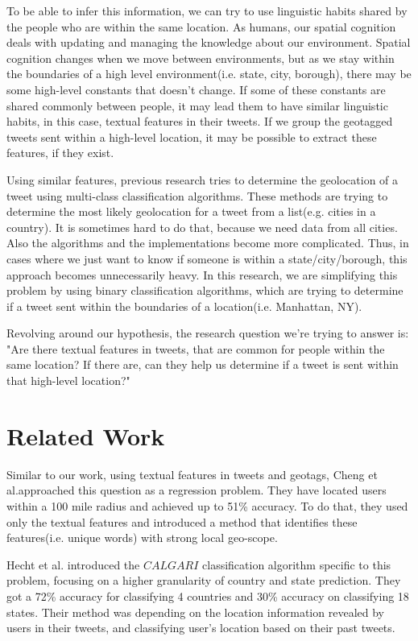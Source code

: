 \documentclass[twoside,11pt]{article}
\begin{document}
To be able to infer this information, we can try to use linguistic habits shared by the people who are within the same location. As humans, our spatial cognition deals with updating and managing the knowledge about our environment. Spatial cognition changes when we move between environments, but as we stay within the boundaries of a high level environment(i.e. state, city, borough), there may be some high-level constants that doesn't change. If some of these constants are shared commonly between people, it may lead them to have similar linguistic habits, in this case, textual features in their tweets. If we group the geotagged tweets sent within a high-level location, it may be possible to extract these features, if they exist.

Using similar features, previous research tries to determine the geolocation of a tweet using multi-class classification algorithms. These methods are trying to determine the most likely geolocation for a tweet from a list(e.g. cities in a country). It is sometimes hard to do that, because we need data from all cities. Also the algorithms and the implementations become more complicated. Thus, in cases where we just want to know if someone is within a state/city/borough, this approach becomes unnecessarily heavy. In this research, we are simplifying this problem by using binary classification algorithms, which are trying to determine if a tweet sent within the boundaries of a location(i.e. Manhattan, NY). 

Revolving around our hypothesis, the research question we're trying to answer is: "Are there textual features in tweets, that are common for people within the same location? If there are, can they help us determine if a tweet is sent within that high-level location?"


\section{Related Work}

Similar to our work, using textual features in tweets and geotags, Cheng et al.approached this question as a regression problem\cite{cheng2010you}. They have located users within a 100 mile radius and achieved up to 51\% accuracy. To do that, they used only the textual features and introduced a method that identifies these features(i.e. unique words) with strong local geo-scope.

Hecht et al. introduced the $CALGARI$ classification algorithm specific to this problem, focusing on a higher granularity of country and state prediction\cite{hecht2011tweets}. They got a 72\% accuracy for classifying 4 countries and 30\% accuracy on classifying 18 states. Their method was depending on the location information revealed by users in their tweets, and classifying user's location based on their past tweets.
\end{document}
